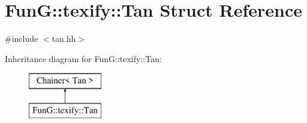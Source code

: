 \hypertarget{structFunG_1_1texify_1_1Tan}{\section{Fun\-G\-:\-:texify\-:\-:Tan Struct Reference}
\label{structFunG_1_1texify_1_1Tan}
}


{\ttfamily \#include $<$tan.\-hh$>$}

Inheritance diagram for Fun\-G\-:\-:texify\-:\-:Tan\-:\begin{figure}[H]
\begin{center}
\leavevmode
\includegraphics[height=2.000000cm]{structFunG_1_1texify_1_1Tan}
\end{center}
\end{figure}
